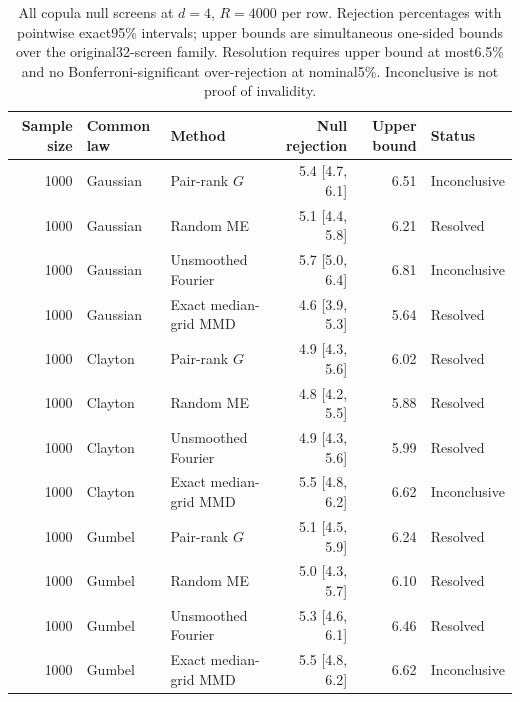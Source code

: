 \begin{table}[t]
\centering
\scriptsize
\caption{All copula null screens at $d=4$, $R=4000$ per row. Rejection percentages with pointwise exact95\% intervals; upper bounds are simultaneous one-sided bounds over the original32-screen family. Resolution requires upper bound at most6.5\% and no Bonferroni-significant over-rejection at nominal5\%. Inconclusive is not proof of invalidity.}
\label{tab:dependence-null-copula-4}
{\setlength{\tabcolsep}{8pt}\renewcommand{\arraystretch}{1.2}
\begin{tabular}{rllrrl}
\toprule
Sample size & Common law & Method & Null rejection & Upper bound & Status\\
\midrule
1000 & Gaussian & Pair-rank $G$ & 5.4 [4.7, 6.1] & 6.51 & Inconclusive\\
1000 & Gaussian & Random ME & 5.1 [4.4, 5.8] & 6.21 & Resolved\\
1000 & Gaussian & Unsmoothed Fourier & 5.7 [5.0, 6.4] & 6.81 & Inconclusive\\
1000 & Gaussian & Exact median-grid MMD & 4.6 [3.9, 5.3] & 5.64 & Resolved\\
1000 & Clayton & Pair-rank $G$ & 4.9 [4.3, 5.6] & 6.02 & Resolved\\
1000 & Clayton & Random ME & 4.8 [4.2, 5.5] & 5.88 & Resolved\\
1000 & Clayton & Unsmoothed Fourier & 4.9 [4.3, 5.6] & 5.99 & Resolved\\
1000 & Clayton & Exact median-grid MMD & 5.5 [4.8, 6.2] & 6.62 & Inconclusive\\
1000 & Gumbel & Pair-rank $G$ & 5.1 [4.5, 5.9] & 6.24 & Resolved\\
1000 & Gumbel & Random ME & 5.0 [4.3, 5.7] & 6.10 & Resolved\\
1000 & Gumbel & Unsmoothed Fourier & 5.3 [4.6, 6.1] & 6.46 & Resolved\\
1000 & Gumbel & Exact median-grid MMD & 5.5 [4.8, 6.2] & 6.62 & Inconclusive\\
\bottomrule
\end{tabular}}
\end{table}

